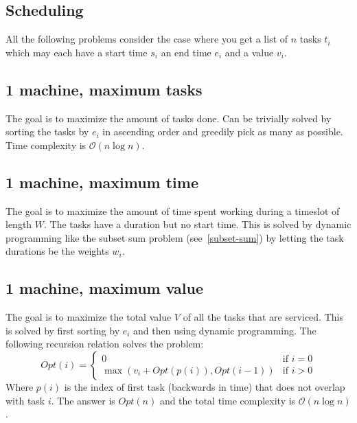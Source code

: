 \documentclass[8pt,a4paper,landscape,oneside]{amsart}
\newcommand{\bigO}{\mathcal{O}}
\begin{document}
\begin{multicols*}{3}
  
\section{Scheduling}
All the following problems consider the case where you get a list of $n$ tasks $t_i$ which may each have a start time $s_i$ an end time $e_i$ and a value $v_i$.
  \subsection{1 machine, maximum tasks}
  The goal is to maximize the amount of tasks done. Can be trivially solved by sorting the tasks by $e_i$ in ascending order and greedily pick as many as possible. Time complexity is $\bigO(n\log n)$.
  
  \subsection{1 machine, maximum time}
  The goal is to maximize the amount of time spent working during a timeslot of length $W$. The tasks have a duration but no start time. This is solved by dynamic programming like the subset sum problem (see~\ref{subset-sum}) by letting the task durations be the weights $w_i$.
  
  \subsection{1 machine, maximum value}
  The goal is to maximize the total value $V$ of all the tasks that are serviced. This is solved by first sorting by $e_i$ and then using dynamic programming. The following recursion relation solves the problem:
  \[
  Opt(i) = \begin{cases}
  0 & \text{if } i = 0 \\
  \max(v_i + Opt(p(i)), Opt(i-1)) & \text{if } i > 0
  \end{cases}
  \]
  Where $p(i)$ is the index of first task (backwards in time) that does not overlap with task $i$. The answer is $Opt(n)$ and the total time complexity is $\bigO(n\log n)$.
  

\end{multicols*}
\end{document}
